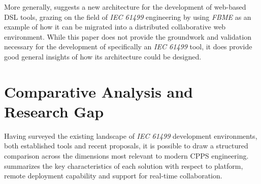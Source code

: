 More generally, \citeauthor{sorokin_towards_2023} \cite{sorokin_towards_2023} suggests a new architecture for the development of web-based \ac{DSL} tools, grazing on the field of \textit{IEC 61499} engineering by using \textit{FBME} as an example of how it can be migrated into a distributed collaborative web environment. While this paper does not provide the groundwork and validation necessary for the development of specifically an \textit{IEC 61499} tool, it does provide good general insights of how its architecture could be designed.

\section{Comparative Analysis and Research Gap}
Having surveyed the existing landscape of \textit{IEC 61499} development environments, both established tools and recent proposals, it is possible to draw a structured comparison across the dimensions most relevant to modern \ac{CPPS} engineering.  summarizes the key characteristics of each solution with respect to platform, remote deployment capability and support for real-time collaboration.

